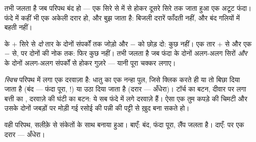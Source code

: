 \begin{proposition}[फंदे का नियम]\label{prop:g3:first-electric-circuit:loop}
 तभी जलता है जब परिपथ बंद हो --- एक सिरे से  में से होकर
दूसरे सिरे तक जाता हुआ एक अटूट फंदा। फंदे में कहीं भी एक अकेली दरार
हो, और  बुझ जाता है: बिजली दरारें फाँदती नहीं, और बंद गलियों में
बहती नहीं।
\end{proposition}

\begin{example}[दोनों सिरे क्यों?]\label{ex:g3:first-electric-circuit:bothends}
 के $+$ सिरे से \emph{दो} तार  के दोनों संपर्कों तक जोड़ो
और $-$ को छोड़ दो: कुछ नहीं। एक तार $+$ से और एक $-$ से, पर दोनों
 की नोक तक: फिर कुछ नहीं।  तभी जलता है जब फंदा  के दोनों
अलग-अलग सिरों \emph{और}  के दोनों अलग-अलग संपर्कों से होकर गुज़रे
--- यानी पूरा चक्कर लगाए।
\end{example}

\begin{example}[स्विच]\label{ex:g3:first-electric-circuit:switch}
\emph{स्विच} परिपथ में लगा एक दरवाज़ा है: धातु का एक
नन्हा पुल, जिसे क्लिक करते ही या तो बिछा दिया जाता है (बंद --- फंदा
पूरा, !) या उठा दिया जाता है (दरार --- अँधेरा)। टॉर्च का बटन,
दीवार पर लगा बत्ती का , दरवाज़े की घंटी का बटन: ये सब फंदे में
लगे दरवाज़े हैं। ऐसा एक  तुम कपड़े की चिमटी और उसके दोनों जबड़ों
पर मोड़ी गई रसोई की पन्नी की पट्टी से ख़ुद बना सकते हो।
\end{example}

\begin{omfigure}

{\small वही परिपथ, सलीक़े से संकेतों के साथ बनाया हुआ। बाएँ: 
बंद, फंदा पूरा, लैंप जलता है। दाएँ:  पर एक दरार --- अँधेरा।}
\end{omfigure}

